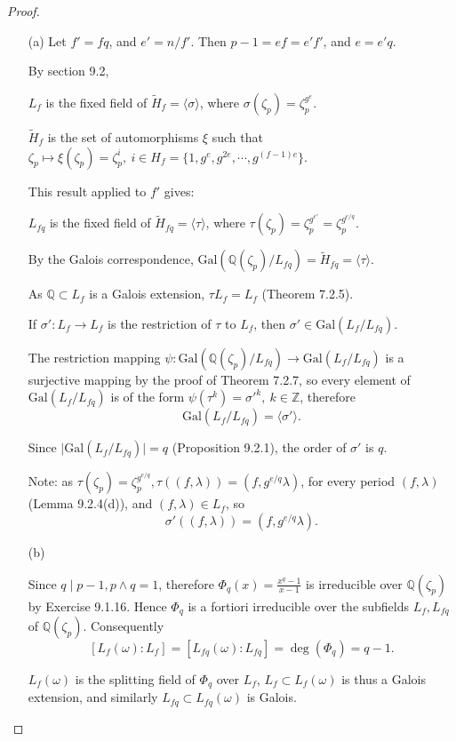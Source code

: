 \documentclass[11pt,a4paper]{article}
\newcommand{\Q}{\mathbb{Q}}
\newcommand{\Z}{\mathbb{Z}}
\newcommand{\Gal}{\mathrm{Gal}}
\begin{document}
\begin{proof}
\begin{enumerate}
\item[(a)]
Let $f' = fq$, and $e'=n/f'$. Then $p-1 = ef = e'f'$, and $e = e'q$.

By section 9.2, 
\begin{center}
$L_f$ is the fixed field of $\tilde{H}_f = \langle \sigma \rangle$, where $\sigma(\zeta_p ) = \zeta_p^{g^e}$.
\end{center}
$\tilde{H}_f$ is the set of automorphisms $\xi$ such that $\zeta_p \mapsto \xi(\zeta_p) =  \zeta_p^i,\   i \in H_f = \{1,g^e,g^{2e},\cdots,g^{(f-1)e}\}$.

This result applied to $f'$ gives:
\begin{center}
$L_{fq}$ is the fixed field of $\tilde{H}_{fq}= \langle \tau \rangle$, where  $\tau(\zeta_p ) = \zeta_p^{g^{e'}} = \zeta_p^{g^{e/q}}$.
\end{center}
By the Galois correspondence,  $\Gal(\Q(\zeta_p)/L_{fq}) =\tilde{H}_{fq} = \langle \tau \rangle$.

As $\Q \subset L_f$ is a Galois extension, $\tau L_f = L_f$ (Theorem 7.2.5).

 If $\sigma' : L_f \to L_f$ is the restriction of $\tau$ to  $L_f$, then $\sigma' \in \Gal(L_f/L_{fq})$.

The restriction mapping $\psi : \Gal(\Q(\zeta_p)/L_{fq}) \to \Gal(L_f/L_{fq})$ is a surjective mapping by the proof of Theorem 7.2.7, so every element of  $\Gal(L_f/L_{fq})$ is of the form $\psi(\tau^k) = \sigma'^k,\ k \in \Z$, therefore
$$\Gal(L_f/L_{fq}) = \langle \sigma' \rangle.$$

Since $\vert \Gal(L_f/L_{fq}) \vert = q$ (Proposition 9.2.1), the order of $\sigma'$ is $q$.

Note: as $\tau(\zeta_p )  = \zeta_p^{g^{e/q}}, \tau((f,\lambda)) = (f,g^{e/q} \lambda)$, for every period $(f,\lambda)$ (Lemma 9.2.4(d)), and $(f,\lambda) \in L_f$, so
$$\sigma'((f,\lambda)) = (f,g^{e/q} \lambda).$$


\item[(b)]

Since $q\mid p-1, p\wedge q = 1$, therefore $\Phi_q(x) = \frac{x^{q}-1}{x-1}$ is irreducible over $\Q(\zeta_p)$ by Exercise 9.1.16. Hence $\Phi_q$ is a fortiori irreducible over the subfields $L_f,L_{fq}$ of $\Q(\zeta_p)$.
Consequently $$[L_f(\omega):L_f] = [L_{fq}(\omega) : L_{fq}] = \deg(\Phi_q) =  q-1.$$
 
 $L_f(\omega)$ is the splitting field of $\Phi_q$ over $L_f$, $L_f \subset L_f(\omega)$ is thus a Galois extension, and similarly $L_{fq} \subset L_{fq}(\omega)$ is Galois.
 

\end{enumerate}
\end{proof}
\end{document}
